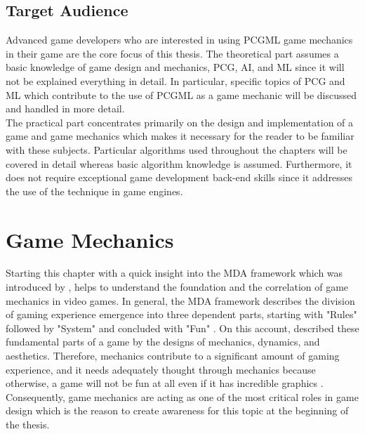 \documentclass[MGS,Master,english]{twbook}%
\begin{document}
\section{Target Audience}
Advanced game developers who are interested in using PCGML game mechanics in their game are the core focus of this thesis. The theoretical part assumes a basic knowledge of game design and mechanics, PCG, \ac{AI}, and ML since it will not be explained everything in detail. In particular, specific topics of PCG and ML which contribute to the use of PCGML as a game mechanic will be discussed and handled in more detail.\\
The practical part concentrates primarily on the design and implementation of a game and game mechanics which makes it necessary for the reader to be familiar with these subjects. Particular algorithms used throughout the chapters will be covered in detail whereas basic algorithm knowledge is assumed. Furthermore, it does not require exceptional game development back-end skills since it addresses the use of the technique in game engines.

%
%
\clearpage
\chapter{Game Mechanics} \label{gameMechanicsChapter}
Starting this chapter with a quick insight into the \ac{MDA} framework which was introduced by \cite{mechanic::MDA}, helps to understand the foundation and the correlation of game mechanics in video games. In general, the MDA framework describes the division of gaming experience emergence into three dependent parts, starting with "Rules" followed by "System" and concluded with "Fun" \cite{mechanic::MDA}.  On this account, \cite{mechanic::MDA} described these fundamental parts of a game by the designs of mechanics, dynamics, and aesthetics. Therefore, mechanics contribute to a significant amount of gaming experience, and it needs adequately thought through mechanics because otherwise, a game will not be fun at all even if it has incredible graphics \cite{gameDesign::gameMechanicsAdvancedGameDesign}. Consequently, game mechanics are acting as one of the most critical roles in game design which is the reason to create awareness for this topic at the beginning of the thesis.
\end{document}
